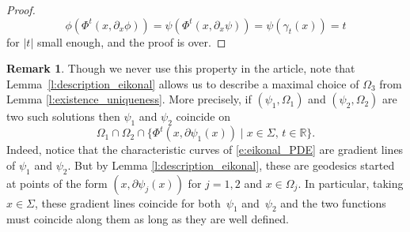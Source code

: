\documentclass[10pt]{amsart}
\let\sep\mid
\theoremstyle{plain}
\theoremstyle{definition}
\newtheorem{remark}[theorem]{Remark}
\newcommand{\R}{\mathbb{R}}
\begin{document}
\begin{appendix}
\begin{proof}
\[
\phi(\Phi^t(x,\partial_x\phi))=\psi(\Phi^t(x,\partial_x\psi))=\psi(\gamma_t(x))=t
\]
for $|t|$ small enough, and the proof is over.
\end{proof}
\begin{remark}
Though we never use this property in the article, note that Lem\-ma~\ref{l:description_eikonal} allows us to describe a maximal choice of $\Omega_3$ from Lemma \ref{l:existence_uniqueness}. More precisely, if $(\psi_1,\Omega_1)$ and $(\psi_2,\Omega_2)$ are two such solutions then $\psi_1$ and $\psi_2$ coincide on
\[
\Omega_1\cap \Omega_2\cap\{\Phi^t(x,\partial\psi_1(x))\sep x\in\Sigma,\, t\in\R\}.
\]
Indeed, notice that the characteristic curves of \eqref{e:eikonal_PDE} are gradient lines of $\psi_1$ and $\psi_2$. But by Lemma \ref{l:description_eikonal}, these are geodesics started at points of the form $(x,\partial\psi_j(x))$ for $j=1,2$ and $x\in\Omega_j$. In particular, taking $x\in\Sigma$, these gradient lines coincide for both~$\psi_1$ and~$\psi_2$ and the two functions must coincide along them as long as they are well defined.
\end{remark}
\end{appendix}
\end{document}
